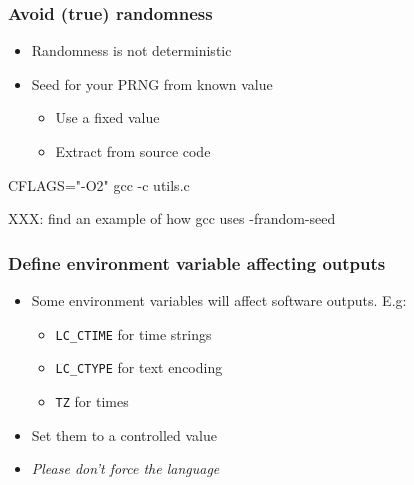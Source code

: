 \documentclass[14pt,ignorenonframetext]{beamer}
\begin{document}
\begin{frame}[fragile]
 \frametitle{Avoid (true) randomness}

 \begin{itemize}
  \item Randomness is not deterministic
  \item<2-> Seed for your PRNG from known value
   \begin{itemize}
     \item Use a fixed value
     \item<3> Extract from source code
   \end{itemize}
 \end{itemize}

 \begin{example}
\begin{semiverbatim}\small
CFLAGS="-O2"
gcc -c utils.c
\end{semiverbatim}
 \end{example}

 XXX: find an example of how gcc uses -frandom-seed
\end{frame}

\begin{frame}
 \frametitle{Define environment variable affecting outputs}

 \begin{itemize}
  \item Some environment variables will affect software outputs. E.g:
   \begin{itemize}
    \item \texttt{LC\_CTIME} for time strings
    \item \texttt{LC\_CTYPE} for text encoding
    \item \texttt{TZ} for times
   \end{itemize}
  \item<2-> Set them to a controlled value
  \item<3> \textit{Please don't force the language}
 \end{itemize}
\end{frame}
\end{document}
